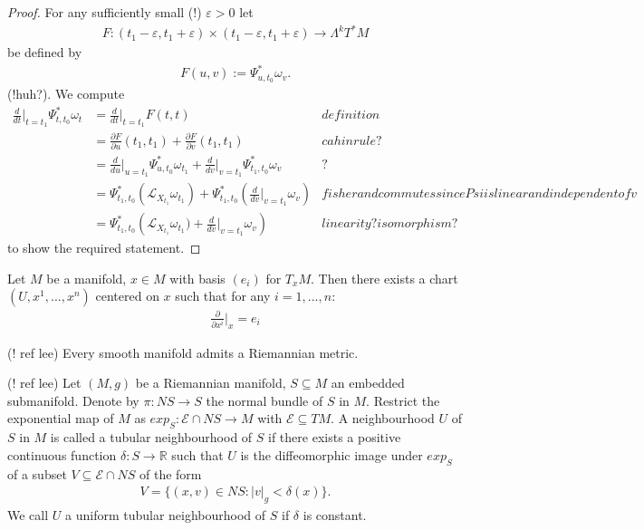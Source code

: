 \begin{proof}
For any sufficiently small (!) $\varepsilon > 0$ let
\begin{align*}
F:(t_1-\varepsilon,t_1+\varepsilon)\times(t_1-\varepsilon,t_1+\varepsilon) \to \Lambda^k T^*M
\end{align*}
be defined by
\begin{align*}
F(u,v) := \Psi^*_{u,t_0}\omega_v .
\end{align*}
(!huh?). We compute
\begin{align*}
\frac{d}{dt}\bigg\vert_{t=t_1} \Psi^*_{t,t_0} \omega_t &= \frac{d}{dt}\bigg\vert_{t=t_1} F(t,t) & definition \\
&= \frac{\partial F}{\partial u}(t_1,t_1) + \frac{\partial F}{\partial v} (t_1,t_1) &cahin rule? \\
&= \frac{d}{du}\bigg\vert_{u=t_1} \Psi^*_{u,t_0} \omega_{t_1} + \frac{d}{dv} \bigg\vert_{v=t_1} \Psi^*_{t_1,t_0} \omega_v &? \\
&= \Psi^*_{t_1,t_0} (\mathcal{L}_{X_{t_1}} \omega_{t_1}) + \Psi^*_{t_1,t_0} \left( \frac{d}{dv}\bigg\vert_{v=t_1} \omega_v \right) & fisher and commutes since Psi is linear and independent of v \\
&=  \Psi^*_{t_1,t_0} \left( \mathcal{L}_{X_{t_1}} \omega_{t_1}) +  \frac{d}{dv}\bigg\vert_{v=t_1} \omega_v \right) & linearity? isomorphism?
\end{align*}
to show the required statement.
\end{proof}

\begin{lemma}\label{auxprop1}
Let $M$ be a manifold, $x \in M$ with basis $(e_i)$ for $T_x M$. Then there exists a chart $(U, x^1, ... ,x^n)$ centered on $x$ such that for any $i = 1, ... , n$:
\begin{align*}
\frac{\partial}{\partial x^i} \bigg\vert_x = e_i
\end{align*}
\end{lemma}

\begin{proposition}
(! ref lee)
Every smooth manifold admits a Riemannian metric.
\end{proposition}

\begin{definition}
(! ref lee)
Let $(M,g)$  be a Riemannian manifold, $S \subseteq M$ an embedded submanifold. Denote by $\pi : NS \to S$ the normal bundle of $S$ in $M$. Restrict the exponential map of $M$ as $exp_S : \mathcal{E} \cap NS \to M$ with $\mathcal{E} \subseteq TM$. A neighbourhood $U$ of $S$ in $M$ is called a tubular neighbourhood of $S$ if there exists a positive continuous function $\delta : S \to \mathbb{R}$ such that $U$ is the diffeomorphic image under $exp_S$ of a subset $V \subseteq \mathcal{E} \cap NS$ of the form 
\begin{align*}
V = \{ (x,v) \in NS : |v|_g < \delta(x) \} .
\end{align*}
We call $U$ a uniform tubular neighbourhood of $S$ if $\delta$ is constant.
\end{definition}


